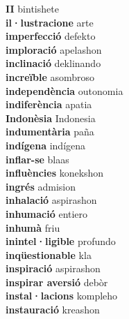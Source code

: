 \textbf{ II  } bintishete \\
\textbf{ il·lustracione  } arte \\
\textbf{ imperfecció  } defekto \\
\textbf{ imploració  } apelashon \\
\textbf{ inclinació  } deklinando \\
\textbf{ increïble  } asombroso \\
\textbf{ independència  } outonomia \\
\textbf{ indiferència  } apatia \\
\textbf{ Indonèsia  } Indonesia \\
\textbf{ indumentària  } paña \\
\textbf{ indígena  } indígena \\
\textbf{ inflar-se  } blaas \\
\textbf{ influències  } konekshon \\
\textbf{ ingrés  } admision \\
\textbf{ inhalació  } aspirashon \\
\textbf{ inhumació  } entiero \\
\textbf{ inhumà  } friu \\
\textbf{ inintel·ligible  } profundo \\
\textbf{ inqüestionable  } kla \\
\textbf{ inspiració  } aspirashon \\
\textbf{ inspirar aversió  } debòr \\
\textbf{ instal·lacions  } kompleho \\
\textbf{ instauració  } kreashon \\
